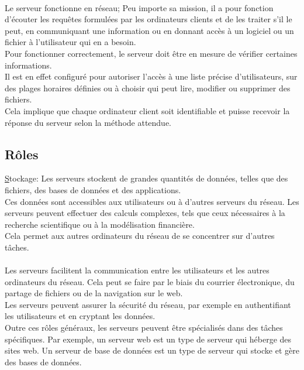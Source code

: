  \paragraph{ }
 Le serveur fonctionne en réseau; Peu importe sa mission, il a pour fonction d’écouter les requêtes formulées par les ordinateurs clients et de les traiter s’il le peut, en communiquant une information ou en donnant accès à un logiciel ou un fichier à l’utilisateur qui en a besoin.\\
  Pour fonctionner correctement, le serveur doit être en mesure de vérifier certaines informations.\\
   Il est en effet configuré pour autoriser l’accès à une liste précise d’utilisateurs, sur des plages horaires définies ou à choisir qui peut lire, modifier ou supprimer des fichiers.\\
   Cela implique que chaque ordinateur client soit identifiable et puisse recevoir la réponse du serveur selon la méthode attendue.
 \subsection*{Rôles}
 
  \underline Stockage: Les serveurs stockent de grandes quantités de données, telles que des fichiers, des bases de données et des applications.\\
   Ces données sont accessibles aux utilisateurs ou à d'autres serveurs du réseau.
  Les serveurs peuvent effectuer des calculs complexes, tels que ceux nécessaires à la recherche scientifique ou à la modélisation financière.\\ Cela permet aux autres ordinateurs du réseau de se concentrer sur d'autres tâches.
  \paragraph{ }
   Les serveurs facilitent la communication entre les utilisateurs et les autres ordinateurs du réseau. Cela peut se faire par le biais du courrier électronique, du partage de fichiers ou de la navigation sur le web.\\
 
   Les serveurs peuvent assurer la sécurité du réseau, par exemple en authentifiant les utilisateurs et en cryptant les données.\\
 
 Outre ces rôles généraux, les serveurs peuvent être spécialisés dans des tâches spécifiques. Par exemple, un serveur web est un type de serveur qui héberge des sites web. Un serveur de base de données est un type de serveur qui stocke et gère des bases de données.\\
 
